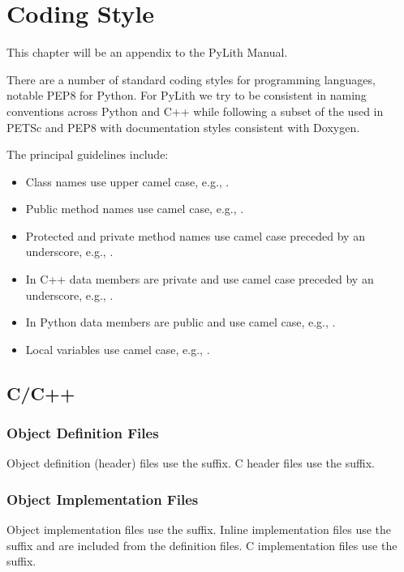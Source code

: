 \chapter{Coding Style}
\label{cha:code:style}

This chapter will be an appendix to the PyLith Manual.

There are a number of standard coding styles for programming
languages, notable PEP8 for Python. For PyLith we try to be consistent
in naming conventions across Python and C++ while following a subset
of the used in PETSc and PEP8 with documentation styles consistent
with Doxygen.

The principal guidelines include:
\begin{itemize}
\item Class names use upper camel case, e.g., .
\item Public method names use camel case, e.g.,
  .
\item Protected and private method names use camel case preceded by an
  underscore, e.g., .
\item In C++ data members are private and use camel case preceded by
  an underscore, e.g., .
\item In Python data members are public and use camel case, e.g., .
\item Local variables use camel case, e.g., .
\end{itemize}

\section{C/C++}

\subsection{Object Definition Files}

Object definition (header) files use the  suffix. C
header files use the  suffix.


\subsection{Object Implementation Files}

Object implementation files use the  suffix. Inline
implementation files use the  suffix and are included
from the definition files. C implementation files use the 
suffix.

